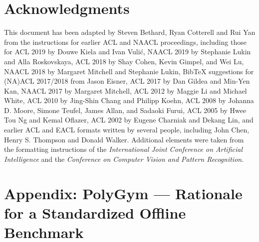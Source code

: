 \documentclass[11pt]{article}
\theoremstyle{definition}          %
\begin{document}

\section*{Acknowledgments}

This document has been adapted
by Steven Bethard, Ryan Cotterell and Rui Yan
from the instructions for earlier ACL and NAACL proceedings, including those for
ACL 2019 by Douwe Kiela and Ivan Vuli\'{c},
NAACL 2019 by Stephanie Lukin and Alla Roskovskaya,
ACL 2018 by Shay Cohen, Kevin Gimpel, and Wei Lu,
NAACL 2018 by Margaret Mitchell and Stephanie Lukin,
Bib\TeX{} suggestions for (NA)ACL 2017/2018 from Jason Eisner,
ACL 2017 by Dan Gildea and Min-Yen Kan,
NAACL 2017 by Margaret Mitchell,
ACL 2012 by Maggie Li and Michael White,
ACL 2010 by Jing-Shin Chang and Philipp Koehn,
ACL 2008 by Johanna D. Moore, Simone Teufel, James Allan, and Sadaoki Furui,
ACL 2005 by Hwee Tou Ng and Kemal Oflazer,
ACL 2002 by Eugene Charniak and Dekang Lin,
and earlier ACL and EACL formats written by several people, including
John Chen, Henry S. Thompson and Donald Walker.
Additional elements were taken from the formatting instructions of the \emph{International Joint Conference on Artificial Intelligence} and the \emph{Conference on Computer Vision and Pattern Recognition}.

%


\appendix


\section{Appendix: PolyGym — Rationale for a Standardized Offline Benchmark}
\label{sec:dataset}
\end{document}
